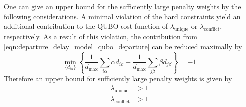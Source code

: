 One can give an upper bound for the sufficiently large penalty weights by the following considerations.
A minimal violation of the hard constraints yield an additional contribution to the QUBO cost function of $\lambda_\text{unique}$ or $\lambda_\text{conflict}$, respectively.
As a result of this violation, the contribution from \eqref{eqn:departure_delay_model_qubo_departure} can be reduced maximally by 
\begin{equation*}
    \min_{\{d_{i\alpha}\}} \left\{\frac{1}{d_\text{max}} \sum_{i\alpha} \alpha d_{i\alpha} - \frac{1}{d_\text{max}}\sum_{j\beta} \beta d_{j\beta} \right\} = - 1
\end{equation*}
Therefore an upper bound for sufficiently large penalty weights is given by
\begin{align*}
    \lambda_\text{unique} & > 1 \\
    \lambda_\text{conflict} &> 1
\end{align*}
